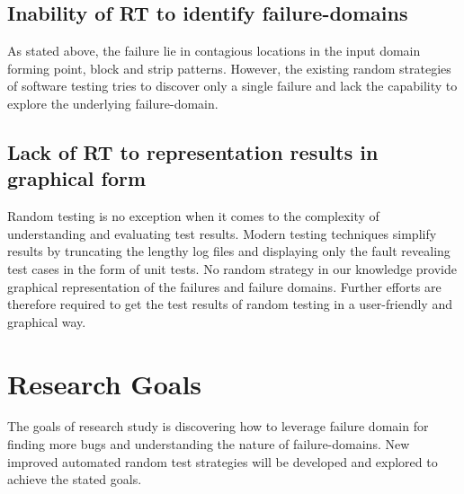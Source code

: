 \subsection{Inability of RT to identify failure-domains}
As stated above, the failure lie in contagious locations in the input domain forming point, block and strip patterns. However, the existing random strategies of software testing tries to discover only a single failure and lack the capability to explore the underlying failure-domain.


\subsection{Lack of RT to representation results in graphical form}
Random testing is no exception when it comes to the complexity of understanding and evaluating test results. Modern testing techniques simplify results by truncating the lengthy log files and displaying only the fault revealing test cases in the form of unit tests. No random strategy in our knowledge provide graphical representation of the failures and failure domains. Further efforts are therefore required to get the test results of random testing in a user-friendly and graphical way. 


\section{Research Goals} \label{ResearchGoals}
The goals of research study is discovering how to leverage failure domain for finding more bugs and understanding the nature of failure-domains. New improved automated random test strategies will be developed and explored to achieve the stated goals.



